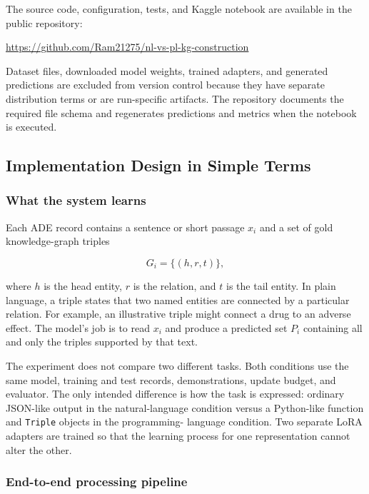 \documentclass[11pt]{article}
\begin{document}
The source code, configuration, tests, and Kaggle notebook are available
in the public repository:

\begin{center}
\url{https://github.com/Ram21275/nl-vs-pl-kg-construction}
\end{center}

Dataset files, downloaded model weights, trained adapters, and generated
predictions are excluded from version control because they have separate
distribution terms or are run-specific artifacts. The repository
documents the required file schema and regenerates predictions and
metrics when the notebook is executed.

\subsection{Implementation Design in Simple Terms}
\label{implementation-design-in-simple-terms}

\subsubsection{What the system learns}

Each ADE record contains a sentence or short passage $x_i$ and a set of
gold knowledge-graph triples

\[
G_i = \{(h,r,t)\},
\]

where $h$ is the head entity, $r$ is the relation, and $t$ is the tail
entity. In plain language, a triple states that two named entities are
connected by a particular relation. For example, an illustrative triple
might connect a drug to an adverse effect. The model's job is to read
$x_i$ and produce a predicted set $P_i$ containing all and only the
triples supported by that text.

The experiment does not compare two different tasks. Both conditions use
the same model, training and test records, demonstrations, update budget,
and evaluator. The only intended difference is how the task is expressed:
ordinary JSON-like output in the natural-language condition versus a
Python-like function and \texttt{Triple} objects in the programming-
language condition. Two separate LoRA adapters are trained so that the
learning process for one representation cannot alter the other.

\subsubsection{End-to-end processing pipeline}
\end{document}
